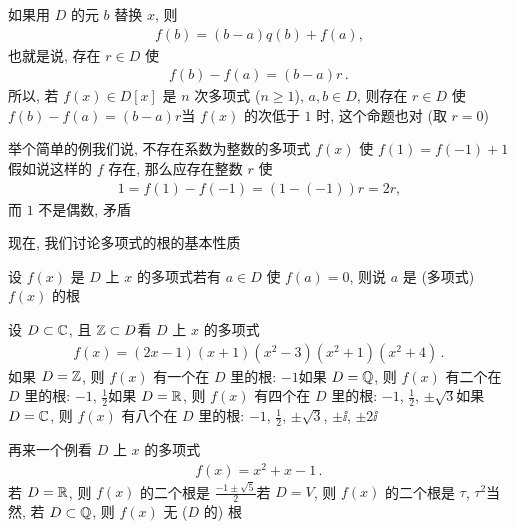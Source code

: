 \begin{remark}
    如果用 $D$ 的元 $b$ 替换 $x$, 则
    \begin{align*}
        f(b) = (b-a)q(b) + f(a),
    \end{align*}
    也就是说, 存在 $r \in D$ 使
    \begin{align*}
        f(b) - f(a) = (b-a)r \period
    \end{align*}
    所以, 若 $f(x) \in D[x]$ 是 $n$ 次多项式 ($n \geq 1$), $a,b \in D$, 则存在 $r \in D$ 使 $f(b) - f(a) = (b-a)r$\period 当 $f(x)$ 的次低于 $1$ 时, 这个命题也对 (取 $r=0$)\period

    举个简单的例\period 我们说, 不存在系数为整数的多项式 $f(x)$ 使 $f(1) = f(-1) + 1$\period 假如说这样的 $f$ 存在, 那么应存在整数 $r$ 使
    \begin{align*}
        1 = f(1) - f(-1) = (1 - (-1))r = 2r,
    \end{align*}
    而 $1$ 不是偶数, 矛盾\period
\end{remark}

现在, 我们讨论多项式的根的基本性质\period

\begin{definition}
    设 $f(x)$ 是 $D$ 上 $x$ 的多项式\period 若有 $a \in D$ 使 $f(a) = 0$, 则说 $a$ 是 (多项式) $f(x)$ 的根 \period
\end{definition}

\begin{example}
    设 $D \subset \mathbb{C}$, 且 $\mathbb{Z} \subset D$\period 看 $D$ 上 $x$ 的多项式
    \begin{align*}
        f(x) = (2x-1)(x+1)(x^2 - 3)(x^2 + 1)(x^2 + 4) \period
    \end{align*}
    如果 $D = \mathbb{Z}$, 则 $f(x)$ 有一个在 $D$ 里的根: $-1$\period 如果 $D = \mathbb{Q}$, 则 $f(x)$ 有二个在 $D$ 里的根: $-1$, $\frac12$\period 如果 $D = \mathbb{R}$, 则 $f(x)$ 有四个在 $D$ 里的根: $-1$, $\frac12$, $\pm \sqrt{3}$\period 如果 $D = \mathbb{C}$, 则 $f(x)$ 有八个在 $D$ 里的根: $-1$, $\frac12$, $\pm \sqrt{3}$, $\pm \ii$, $\pm 2\ii$\period
\end{example}

\begin{example}
    再来一个例\period 看 $D$ 上 $x$ 的多项式
    \begin{align*}
        f(x) = x^2 + x - 1 \period
    \end{align*}
    若 $D = \mathbb{R}$, 则 $f(x)$ 的二个根是 $\frac{-1 \pm \sqrt{5}}{2}$\period 若 $D = V$, 则 $f(x)$ 的二个根是 $\tau$, $\tau^2$\period 当然, 若 $D \subset \mathbb{Q}$, 则 $f(x)$ 无 ($D$ 的) 根\period
\end{example}

